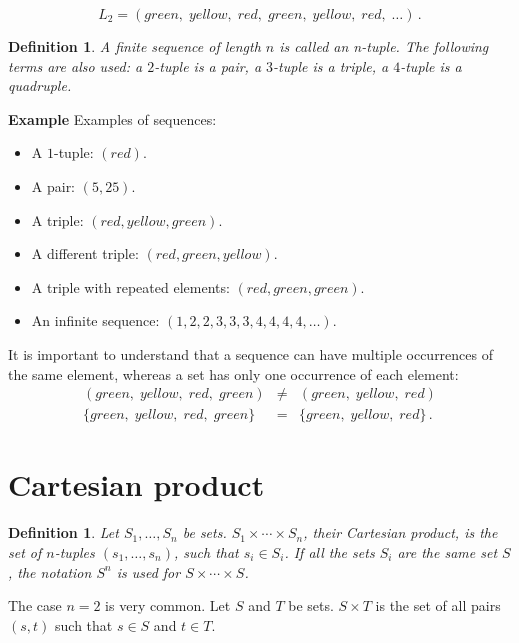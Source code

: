 \documentclass[12pt,a4paper]{article}
\newtheorem{definition}[theorem]{Definition}
\newenvironment{example}{\textbf{Example}}{}
\begin{document}
\[
L_2=(\mathit{green},\; \mathit{yellow},\; \mathit{red},\; \mathit{green},\; \mathit{yellow},\; \mathit{red},\; \ldots)\,.
\]
\begin{definition}
A finite sequence of length $n$ is called an \emph{n-tuple}. The
following terms are also used: a $2$-tuple is a \emph{pair}, a $3$-tuple
is a \emph{triple}, a $4$-tuple is a \emph{quadruple}.
\end{definition}

\begin{example} Examples of sequences:
\begin{itemize}
\item A $1$-tuple: $(\mathit{red})$.
\item A pair: $(5, 25)$.
\item A triple: $(\mathit{red}, \mathit{yellow}, \mathit{green})$.
\item A different triple: $(\mathit{red}, \mathit{green}, \mathit{yellow})$.
\item A triple with repeated elements: $(\mathit{red}, \mathit{green}, \mathit{green})$.
\item An infinite sequence: $(1, 2, 2, 3, 3, 3, 4, 4, 4, 4, \ldots)$.
\end{itemize}
\end{example}
It is important to understand that a sequence can have multiple occurrences of the same element, whereas a set has only one occurrence of each element:
\begin{eqnarray*}
(\mathit{green},\; \mathit{yellow},\; \mathit{red},\; \mathit{green})&\neq& (\mathit{green},\; \mathit{yellow},\; \mathit{red})\\
\{\mathit{green},\; \mathit{yellow},\; \mathit{red},\; \mathit{green}\}&=& \{\mathit{green},\; \mathit{yellow},\; \mathit{red}\}\,.
\end{eqnarray*}

\section{Cartesian product}
\begin{definition}
Let $S_{1}, \ldots, S_{n}$ be sets. $S_{1}\times\cdots\times S_{n}$, their \emph{Cartesian product}, is the set of $n$-tuples $(s_1,\ldots,s_n)$, such that $s_i\in S_{i}$. If all the sets $S_{i}$ are the same set $S$, the notation $S^{n}$ is used for $S\times\cdots\times S$.
\end{definition}
The case $n=2$  is very common. Let $S$ and $T$ be sets. $S\times T$ is the set of all pairs $(s,t)$ such that $s\in S$ and $t\in T$.
\end{document}
